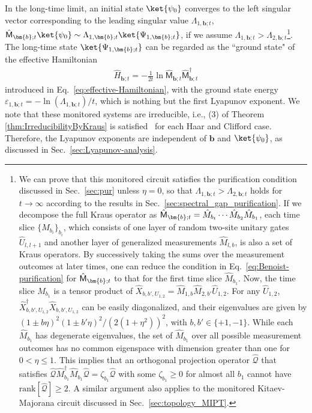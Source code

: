 \documentclass[preprint,pteplogo]{ptephy_v2}%
\numberwithin{equation}{section}
\theoremstyle{definition}
\newcommand{\mc}[1]{\mathcal{#1}}
\begin{document}
In the long-time limit, an initial state $\ket{\psi_0}$ converges to the left singular vector corresponding to the leading singular value $\Lambda_{1,\bm{b};t}$, $\hat{\mathsf{M}}_{\bm{b};t}\ket{\psi_0} \sim \Lambda_{1,\bm{b};t}\ket{\Psi_{1,\bm{b};t}}$, if we assume $\Lambda_{1,\bm{b};t} > \Lambda_{2,\bm{b};t}$\footnote{
We can prove that this monitored circuit satisfies the purification condition discussed in Sec.~\ref{sec:pur} unless $\eta=0$, so that $\Lambda_{1,\bm{b};t} > \Lambda_{2,\bm{b};t}$ holds for $t \to \infty$ according to the results in Sec.~\ref{sec:spectral_gap_purification}.
If we decompose the full Kraus operator as $\hat{\sf{M}}_{\bm{b};t} = \hat{M}_{b_t} \cdots \hat{M}_{b_2} \hat{M}_{b_1}$, each time slice $\{ \hat{M}_{b_i} \}_{b_i}$, which consists of one layer of random two-site unitary gates $\hat{U}_{l,l+1}$ and another layer of generalized measurements $\hat{M}_{l,b}$, is also a set of Kraus operators.
By successively taking the sums over the measurement outcomes at later times, one can reduce the condition in Eq.~\eqref{eq:Benoist-purification} for $\hat{\sf{M}}_{\bm{b};t}$ to that for the first time slice $\hat{M}_{b_1}$.
Now, the time slice $\hat{M}_{b_1}$ is a tensor product of $\hat{X}_{b,b',U_{1,2}}=\hat{M}_{1,b} \hat{M}_{2,b'} \hat{U}_{1,2}$. 
For any $\hat{U}_{1,2}$, $\hat{X}^\dagger_{b,b',U_{1,2}} \hat{X}_{b,b',U_{1,2}}$ can be easily diagonalized, and their eigenvalues are given by $(1 \pm b\eta)^2 (1 \pm b'\eta)^2/(2(1+\eta^2))^2$, with $b,b'\in\{+1,-1\}$.
While each $\hat{M}_{b_1}$ has degenerate eigenvalues, the set of $\hat{M}_{b_1}$ over all possible measurement outcomes has no common eigenspace with dimension greater than one for $0 < \eta \leq 1$.
This implies that an orthogonal projection operator $\hat{\mc{Q}}$ that satisfies $\hat{\mc{Q}} \hat{M}_{b_1}^\dagger \hat{M}_{b_1} \hat{\mc{Q}} = \zeta_{b_1} \hat{\mc{Q}}$ with some $\zeta_{b_1} \geq 0$ for almost all $b_1$ cannot have $\mathrm{rank}[\hat{\mc{Q}}] \geq 2$.
A similar argument also applies to the monitored Kitaev-Majorana circuit discussed in Sec.~\ref{sec:topology_MIPT}.
}.
The long-time state $\ket{\Psi_{1,\bm{b};t}}$ can be regarded as the ``ground state" of the effective Hamiltonian
\begin{align} \label{eq:EffHamMochi}
    \hat{H}_{\bm{b};t} = -\frac{1}{2t}\ln \hat{\mathsf{M}}_{\bm{b};t}\hat{\mathsf{M}}_{\bm{b};t}^\dagger
\end{align}
introduced in Eq.~\eqref{eq:effective-Hamiltonian}, with the ground state energy $\varepsilon_{1,\bm{b};t}=-\ln(\Lambda_{1,\bm{b};t})/t$, which is nothing but the first Lyapunov exponent. 
We note that these monitored systems are irreducible, i.e., (3) of Theorem \ref{thm:IrreducibilityByKraus} is satisfied~\cite{mochizuki2025transitions} for each Haar and Clifford case. 
Therefore, the Lyapunov exponents are independent of $\bm{b}$ and $\ket{\psi_0}$, as discussed in Sec.~\ref{sec:Lyapunov-analysis}.
\end{document}
